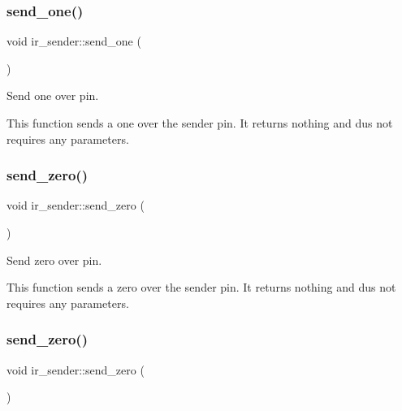 \subsubsection{\texorpdfstring{send\+\_\+one()}{send\_one()}\hspace{0.1cm}{\footnotesize\ttfamily [2/2]}}
{\footnotesize\ttfamily void ir\+\_\+sender\+::send\+\_\+one (\begin{DoxyParamCaption}{ }\end{DoxyParamCaption})\hspace{0.3cm}{\ttfamily [inline]}}



Send one over pin. 

This function sends a one over the sender pin. It returns nothing and dus not requires any parameters. \hypertarget{classir__sender_a3868a2512035b0f6b5b6df093db22fbb}{}\label{classir__sender_a3868a2512035b0f6b5b6df093db22fbb} 
\subsubsection{\texorpdfstring{send\+\_\+zero()}{send\_zero()}\hspace{0.1cm}{\footnotesize\ttfamily [1/2]}}
{\footnotesize\ttfamily void ir\+\_\+sender\+::send\+\_\+zero (\begin{DoxyParamCaption}{ }\end{DoxyParamCaption})\hspace{0.3cm}{\ttfamily [inline]}}



Send zero over pin. 

This function sends a zero over the sender pin. It returns nothing and dus not requires any parameters. \hypertarget{classir__sender_a3868a2512035b0f6b5b6df093db22fbb}{}\label{classir__sender_a3868a2512035b0f6b5b6df093db22fbb} 
\subsubsection{\texorpdfstring{send\+\_\+zero()}{send\_zero()}\hspace{0.1cm}{\footnotesize\ttfamily [2/2]}}
{\footnotesize\ttfamily void ir\+\_\+sender\+::send\+\_\+zero (\begin{DoxyParamCaption}{ }\end{DoxyParamCaption})\hspace{0.3cm}{\ttfamily [inline]}}



